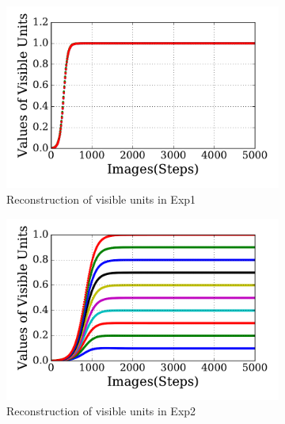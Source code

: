 \begin{figure}
\DIFdelendFL \DIFaddbeginFL \begin{subfigure}[t]{0.48\textwidth}
		\DIFaddendFL \includegraphics[width=\textwidth]{pics_sdlm/20_exp_AE/exp1_recon_non.pdf}
		\caption{Reconstruction of visible units in Exp1}
	\end{subfigure}
	\DIFdelbeginFL %
\DIFdelendFL \DIFaddbeginFL \begin{subfigure}[t]{0.48\textwidth}
		\DIFaddendFL \includegraphics[width=\textwidth]{pics_sdlm/20_exp_AE/exp2_recon_non.pdf}
		\caption{Reconstruction of visible units in Exp2}
	\end{subfigure}\\
	\DIFdelbeginFL %
\DIFdelendFL \DIFaddbeginFL \begin{subfigure}[t]{0.48\textwidth}

\end{subfigure}
\end{figure}
